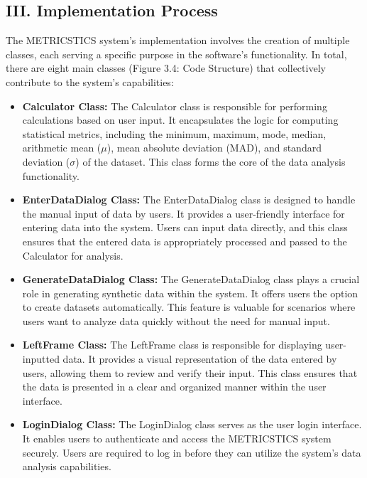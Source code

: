 \documentclass[english,12pt,a4paper]{report}
\begin{document}
	\subsection*{III. Implementation Process}
	
	The METRICSTICS system's implementation involves the creation of multiple classes, each serving a specific purpose in the software's functionality. In total, there are eight main classes (Figure 3.4: Code Structure) that collectively contribute to the system's capabilities:
	\begin{itemize}[leftmargin=*]
		
		\item \textbf{Calculator Class:} The Calculator class is responsible for performing calculations based on user input. It encapsulates the logic for computing statistical metrics, including the minimum, maximum, mode, median, arithmetic mean ($\mu$), mean absolute deviation (MAD), and standard deviation ($\sigma$) of the dataset. This class forms the core of the data analysis functionality.
		
		\item \textbf{EnterDataDialog Class:} The EnterDataDialog class is designed to handle the manual input of data by users. It provides a user-friendly interface for entering data into the system. Users can input data directly, and this class ensures that the entered data is appropriately processed and passed to the Calculator for analysis.
		
		\item \textbf{GenerateDataDialog Class:} The GenerateDataDialog class plays a crucial role in generating synthetic data within the system. It offers users the option to create datasets automatically. This feature is valuable for scenarios where users want to analyze data quickly without the need for manual input.
		
		\item \textbf{LeftFrame Class:} The LeftFrame class is responsible for displaying user-inputted data. It provides a visual representation of the data entered by users, allowing them to review and verify their input. This class ensures that the data is presented in a clear and organized manner within the user interface.
		
		\item \textbf{LoginDialog Class:} The LoginDialog class serves as the user login interface. It enables users to authenticate and access the METRICSTICS system securely. Users are required to log in before they can utilize the system's data analysis capabilities.
		

\end{itemize}
\end{document}
